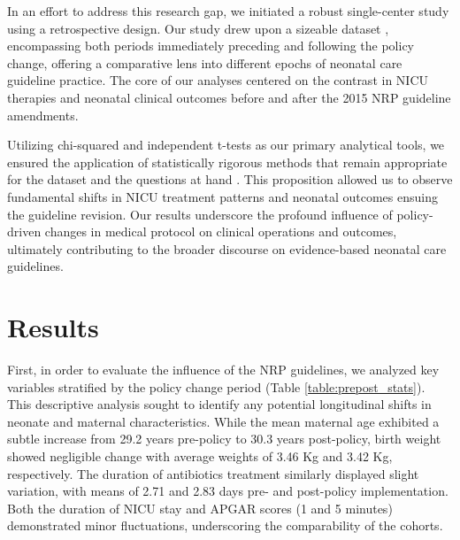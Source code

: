 \documentclass[11pt]{article}
\begin{document}
In an effort to address this research gap, we initiated a robust single-center study using a retrospective design. Our study drew upon a sizeable dataset \cite{Pados2020SystematicRO}, encompassing both periods immediately preceding and following the policy change, offering a comparative lens into different epochs of neonatal care guideline practice. The core of our analyses centered on the contrast in NICU therapies and neonatal clinical outcomes before and after the 2015 NRP guideline amendments.

Utilizing chi-squared and independent t-tests as our primary analytical tools, we ensured the application of statistically rigorous methods that remain appropriate for the dataset and the questions at hand \cite{Li2016ConfirmatoryFA}. This proposition allowed us to observe fundamental shifts in NICU treatment patterns and neonatal outcomes ensuing the guideline revision. Our results underscore the profound influence of policy-driven changes in medical protocol on clinical operations and outcomes, ultimately contributing to the broader discourse on evidence-based neonatal care guidelines.

\section*{Results}

First, in order to evaluate the influence of the NRP guidelines, we analyzed key variables stratified by the policy change period (Table \ref{table:prepost_stats}). This descriptive analysis sought to identify any potential longitudinal shifts in neonate and maternal characteristics. While the mean maternal age exhibited a subtle increase from 29.2 years pre-policy to 30.3 years post-policy, birth weight showed negligible change with average weights of 3.46 Kg and 3.42 Kg, respectively. The duration of antibiotics treatment similarly displayed slight variation, with means of 2.71 and 2.83 days pre- and post-policy implementation. Both the duration of NICU stay and APGAR scores (1 and 5 minutes) demonstrated minor fluctuations, underscoring the comparability of the cohorts.
\end{document}
